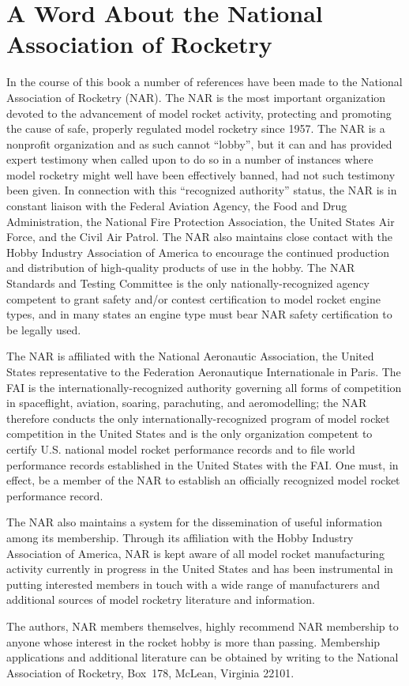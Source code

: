 \chapter{A Word About the National Association of Rocketry}\label{appD}

In the course of this book a number of references have been made to the National Association of
Rocketry (NAR)\@. The NAR is the most important organization devoted to the advancement of model
rocket activity, protecting and promoting the cause of safe, properly regulated model rocketry
since 1957. The NAR is a nonprofit organization and as such cannot ``lobby'', but it can and has
provided expert testimony when called upon to do so in a number of instances where model rocketry
might well have been effectively banned, had not such testimony been given. In connection with this
``recognized authority'' status, the NAR is in constant liaison with the Federal Aviation Agency, the
Food and Drug Administration, the National Fire Protection Association, the United States Air Force,
and the Civil Air Patrol. The NAR also maintains close contact with the Hobby Industry Association
of America to encourage the continued production and distribution of high-quality products of use
in the hobby. The NAR Standards and Testing Committee is the only nationally-recognized agency
competent to grant safety and/or contest certification to model rocket engine types, and in many
states an engine type must bear NAR safety certification to be legally used.

The NAR is affiliated with the National Aeronautic Association, the United States representative to
the Federation Aeronautique Internationale in Paris. The FAI is the internationally-recognized
authority governing all forms of competition in spaceflight, aviation, soaring, parachuting, and
aeromodelling; the NAR therefore conducts the only internationally-recognized program of model
rocket competition in the United States and is the only organization competent to certify U.S.
national model rocket performance records and to file world performance records established in the
United States with the FAI\@. One must, in effect, be a member of the NAR to establish an officially
recognized model rocket performance record.

The NAR also maintains a system for the dissemination of useful information among its membership.
Through its affiliation with the Hobby Industry Association of America, NAR is kept aware of all
model rocket manufacturing activity currently in progress in the United States and has been
instrumental in putting interested members in touch with a wide range of manufacturers and
additional sources of model rocketry literature and information.

The authors, NAR members themselves, highly recommend NAR membership to anyone whose interest in
the rocket hobby is more than passing. Membership applications and additional literature can be
obtained by writing to the National Association of Rocketry, Box~178, McLean, Virginia 22101.
